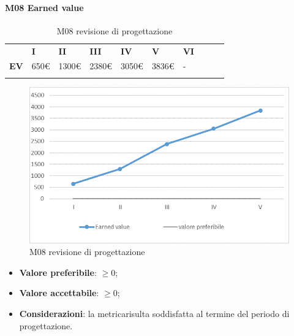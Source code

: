 \paragraph{M08 Earned value} \mbox{}
\begin{longtable}[H!] {						
		>{}p{38mm}  		
		>{}p{12mm}
		>{}p{12mm}		
		>{}p{12mm}		
		>{}p{12mm}		
		>{}p{12mm}		
		>{}p{12mm}
		>{}p{12mm}
		>{}p{12mm}
		>{}p{12mm}
	}
	\rowcolor{gray!50}
	\textbf{} & \textbf{I} & \textbf{II} & \textbf{III} & \textbf{IV} & \textbf{V} & \textbf{VI} \TBstrut \\ [2mm]
	\textbf{EV} & 650\euro & 1300\euro & 2380\euro & 3050\euro & 3836\euro & - \TBstrut \\ [2mm]
	\rowcolor{white}
	\caption{M08 revisione di progettazione\glo}
\end{longtable}
\begin{figure}[H] 	
\includegraphics[width=\linewidth]{./img/grafici/RP5.png}	
\caption{M08 revisione di progettazione\glo}	
\end{figure}
\begin{itemize}
	\item \textbf{Valore preferibile}: $\ge0$;
	\item \textbf{Valore accettabile}: $\ge0$;
	\item \textbf{Considerazioni}: la metrica\glosp risulta soddisfatta al termine del periodo di progettazione\glo.
\end{itemize}
